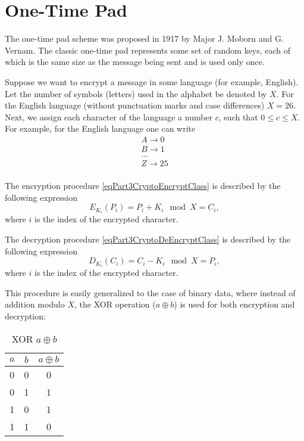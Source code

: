 \section{One-Time Pad}
The one-time pad scheme was proposed in 1917 by Major J. Moborn and G. Vernam. The classic one-time pad represents some set of random keys, each of which is the same size as the message being sent and is used only once.

Suppose we want to encrypt a message in some language (for example, English). Let the number of symbols (letters) used in the alphabet be denoted by $X$. For the English language (without punctuation marks and case differences) $X = 26$. Next, we assign each character of the language a number $c$, such that $0 \le c \le X$. For example, for the English language one can write
\begin{equation}
\begin{array}{c}
A \rightarrow 0 \\
B \rightarrow 1 \\
\dots \\
Z \rightarrow 25 \\
\end{array}
\nonumber
\end{equation}

The encryption procedure \eqref{eqPart3CryptoEncryptClass} is described by the following expression
\begin{equation}
E_{K_i}\left(P_i\right) = P_i + K_i \mod X = C_i,
\label{eqPart3CryptoEncryptVernam}
\end{equation}
where $i$ is the index of the encrypted character.

The decryption procedure \eqref{eqPart3CryptoDeEncryptClass} is described by the following expression
\begin{equation}
D_{K_i}\left(C_i\right) = C_i - K_i \mod X = P_i,
\label{eqPart3CryptoDeEncryptVernam}
\end{equation}
where $i$ is the index of the encrypted character.

This procedure is easily generalized to the case of binary data, where instead of addition modulo $X$, the XOR operation ($a \oplus b$) is used for both encryption and decryption:
\begin{table}
\centering
\begin{tabular}{|c|c|c|}
\hline
$a$ & $b$ & $a \oplus b$ \\ \hline
0  & 0 & 0 \\
0  & 1 & 1 \\
1  & 0 & 1 \\
1  & 1 & 0 \\ \hline
\end{tabular}
\caption{XOR $a \oplus b$}
\label{tblXOR}
\end{table}

